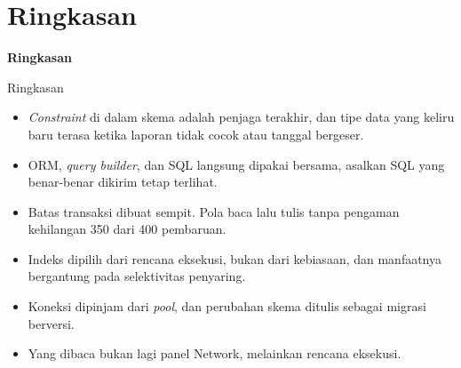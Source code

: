 \documentclass[aspectratio=169, table, 12pt]{beamer}
\begin{document}
\section{Ringkasan}

\begin{frame}{\hfill}
  \centering
  \Huge{\textbf{Ringkasan}}
\end{frame}

\begin{frame}{{\Large Ringkasan}}
  \vspace{8pt}
  \begin{itemize}
    \item \textit{Constraint} di dalam skema adalah penjaga terakhir, dan tipe data yang
          keliru baru terasa ketika laporan tidak cocok atau tanggal bergeser.
    \item ORM, \textit{query builder}, dan SQL langsung dipakai bersama,
          asalkan SQL yang benar-benar dikirim tetap terlihat.
    \item Batas transaksi dibuat sempit. Pola baca lalu tulis tanpa pengaman
          kehilangan 350 dari 400 pembaruan.
    \item Indeks dipilih dari rencana eksekusi, bukan dari kebiasaan, dan
          manfaatnya bergantung pada selektivitas penyaring.
    \item Koneksi dipinjam dari \textit{pool}, dan perubahan skema ditulis sebagai
          migrasi berversi.
    \item Yang dibaca bukan lagi panel Network, melainkan rencana eksekusi.
  \end{itemize}
\end{frame}
\end{document}
